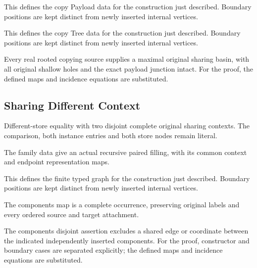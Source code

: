 This defines the copy Payload data for the construction just described. Boundary positions are kept distinct from newly inserted internal vertices.
\par{}

This defines the copy Tree data for the construction just described. Boundary positions are kept distinct from newly inserted internal vertices.
\par{}

Every real rooted copying source supplies a maximal original sharing basin, with all original shallow holes and the exact payload junction intact.
For the proof, the defined maps and incidence equations are substituted.
\par{}

\subsection{Sharing Different Context}
Different-store equality with two disjoint complete original sharing contexts. The comparison, both instance entries and both store nodes remain literal.

The family data give an actual recursive paired filling, with its common context and endpoint representation maps.
\par{}

This defines the finite typed graph for the construction just described. Boundary positions are kept distinct from newly inserted internal vertices.
\par{}

The components map is a complete occurrence, preserving original labels and every ordered source and target attachment.
\par{}

The components disjoint assertion excludes a shared edge or coordinate between the indicated independently inserted components.
For the proof, constructor and boundary cases are separated explicitly; the defined maps and incidence equations are substituted.
\par{}

